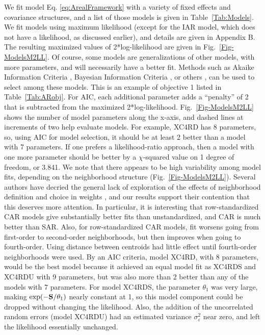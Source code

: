 \documentclass[11pt, titlepage]{article}\usepackage[]{graphicx}\usepackage[]{color}
\begin{document}
\begin{spacing}{1.9}
\begin{flushleft}
We fit model Eq. \ref{eq:ArealFramework} with a variety of fixed effects and covariance structures, and a list of those models is given in Table~\ref{Tab:Models}.  We fit models using maximum likelihood (except for the IAR model, which does not have a likelihood, as discussed earlier), and details are given in Appendix B. The resulting maximized values of 2*log-likelihood are given in Fig.~\ref{Fig-ModelsM2LL}. Of course, some models are generalizations of other models, with more parameters, and will necessarily have a better fit.  Methods such as Akaike Information Criteria \citep[AIC,][]{Akai:Info:1973}, Bayesian Information Criteria \citep[BIC,][]{Schw:esti:1978}, or others \citep[see, e.g.,][]{Burn:Ande:mode:2002,Hoot:Hobb:guid:2015}, can be used to select among these models. This is an example of objective 1 listed in Table~\ref{Tab:ARobj}. For AIC, each additional parameter adds a ``penalty'' of 2 that is subtracted from the maximized 2*log-likelihood.  Fig.~\ref{Fig-ModelsM2LL} shows the number of model parameters along the x-axis, and dashed lines at increments of two help evaluate models. For example, XC4RD has 8 parameters, so, using AIC for model selection, it should be at least 2 better than a model with 7 parameters.  If one prefers a likelihood-ratio approach, then a model with one more parameter should be better by a $\chi$-squared value on 1 degree of freedom, or 3.841. We note that there appears to be high variability among model fits, depending on the neighborhood structure (Fig.~\ref{Fig-ModelsM2LL}).  Several authors have decried the general lack of exploration of the effects of neighborhood definition and choice in weights \citep{Best:Cock:Benn:Wake:Elli:ecol:2001,Earn:Morg:Meng:Ryan:Summ:Bear:eval:2007}, and our results support their contention that this deserves more attention.  In particular, it is interesting that row-standardized CAR models give substantially better fits than unstandardized, and CAR is much better than SAR. Also, for row-standardized CAR models, fit worsens going from first-order to second-order neighborhoods, but then improves when going to fourth-order.  Using distance between centroids had little effect until fourth-order neighborhoods were used.  By an AIC criteria, model XC4RD, with 8 parameters, would be the best model because it achieved an equal model fit as XC4RDS and XC4RDU with 9 parameters, but was also more than 2 better than any of the models with 7 parameters. For model XC4RDS, the parameter $\theta_1$ was very large, making $\exp(-\mathbf{S}/\theta_1)$ nearly constant at 1, so this model component could be dropped without changing the likelihood.  Also, the addition of the uncorrelated random errors (model XC4RDU) had an estimated variance $\sigma_\varepsilon^2$ near zero, and left the likelihood essentially unchanged. 


\end{flushleft}
\end{spacing}
\end{document}
